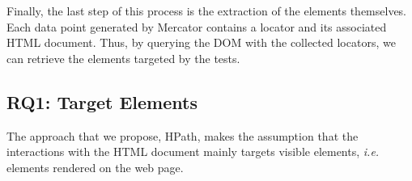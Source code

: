 Finally, the last step of this process is the extraction of the elements themselves. Each data point generated by Mercator contains a locator and its associated HTML document. Thus, by querying the DOM with the collected locators, we can retrieve the elements targeted by the tests.

\subsection{RQ1: Target Elements}
\label{sec:hpath-protocol-rq1}



The approach that we propose, HPath, makes the assumption that the interactions with the HTML document mainly targets visible elements, \emph{i.e.} elements rendered on the web page. 


